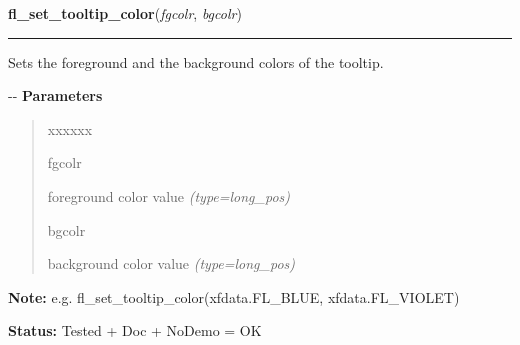     \vspace{0.5ex}

\hspace{.8\funcindent}\begin{boxedminipage}{\funcwidth}

    \raggedright \textbf{fl\_set\_tooltip\_color}(\textit{fgcolr}, \textit{bgcolr})

    \vspace{-1.5ex}

    \rule{\textwidth}{0.5\fboxrule}
\setlength{\parskip}{2ex}

Sets the foreground and the background colors of the tooltip.

-{}-
\setlength{\parskip}{1ex}
      \textbf{Parameters}
      \vspace{-1ex}

      \begin{quote}
        \begin{Ventry}{xxxxxx}

          \item[fgcolr]


foreground color value
            {\it (type=long\_pos)}

          \item[bgcolr]


background color value
            {\it (type=long\_pos)}

        \end{Ventry}

      \end{quote}

\textbf{Note:} 
e.g. fl\_set\_tooltip\_color(xfdata.FL\_BLUE, xfdata.FL\_VIOLET)


\textbf{Status:} 
Tested + Doc + NoDemo = OK


    \end{boxedminipage}

    \label{xformslib:flgoodies:fl_set_tooltip_boxtype}

    \vspace{0.5ex}

